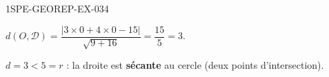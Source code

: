 \begin{corrige}{1SPE-GEOREP-EX-034}

$d(O, \mathcal{D}) = \dfrac{|3 \times 0 + 4 \times 0 - 15|}{\sqrt{9 + 16}} = \dfrac{15}{5} = 3$.

$d = 3 < 5 = r$ : la droite est \textbf{sécante} au cercle (deux points d'intersection).

\end{corrige}
